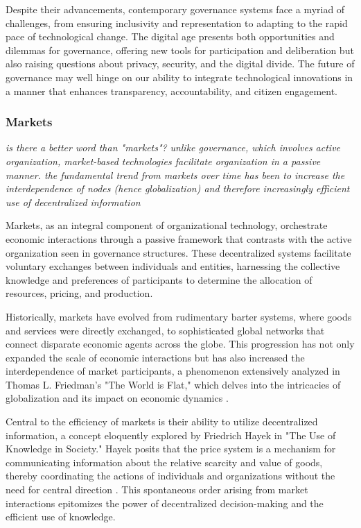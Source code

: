 \documentclass{article}
\begin{document}
Despite their advancements, contemporary governance systems face a myriad of challenges, from ensuring inclusivity and representation to adapting to the rapid pace of technological change. The digital age presents both opportunities and dilemmas for governance, offering new tools for participation and deliberation but also raising questions about privacy, security, and the digital divide. The future of governance may well hinge on our ability to integrate technological innovations in a manner that enhances transparency, accountability, and citizen engagement.

\subsubsection{Markets}
\label{sec:Markets}

\textit{is there a better word than "markets"?} 
\textit{unlike governance, which involves active organization, market-based technologies facilitate organization in a passive manner. the fundamental trend from markets over time has been to increase the interdependence of nodes (hence globalization) and therefore increasingly efficient use of decentralized information}

Markets, as an integral component of organizational technology, orchestrate economic interactions through a passive framework that contrasts with the active organization seen in governance structures. These decentralized systems facilitate voluntary exchanges between individuals and entities, harnessing the collective knowledge and preferences of participants to determine the allocation of resources, pricing, and production.

Historically, markets have evolved from rudimentary barter systems, where goods and services were directly exchanged, to sophisticated global networks that connect disparate economic agents across the globe. This progression has not only expanded the scale of economic interactions but has also increased the interdependence of market participants, a phenomenon extensively analyzed in Thomas L. Friedman's "The World is Flat," which delves into the intricacies of globalization and its impact on economic dynamics \cite{Friedman2005World}.

Central to the efficiency of markets is their ability to utilize decentralized information, a concept eloquently explored by Friedrich Hayek in "The Use of Knowledge in Society." Hayek posits that the price system is a mechanism for communicating information about the relative scarcity and value of goods, thereby coordinating the actions of individuals and organizations without the need for central direction \cite{Hayek1945Use}. This spontaneous order arising from market interactions epitomizes the power of decentralized decision-making and the efficient use of knowledge.
\end{document}
